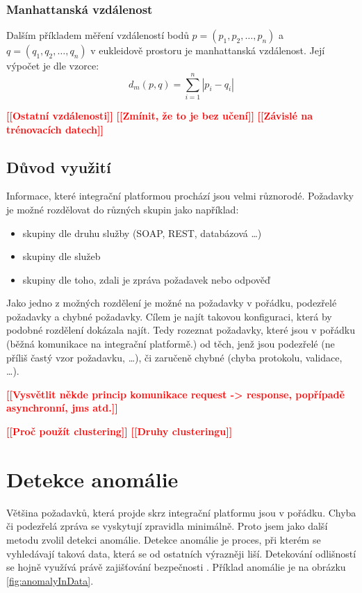 \documentclass[thesis=M,czech]{FITthesis}[2012/10/20]
\newcommand{\todo}[1]{\textcolor{red}{\textbf{[[#1]]}}}
\begin{document}
				\subsubsection{Manhattanská vzdálenost}
				Dalším příkladem měření vzdáleností bodů $p = (p_1, p_2, \ldots, p_n)$ a $q = (q_1, q_2, \ldots, q_n)$ v eukleidově prostoru je manhattanská vzdálenost. Její výpočet je dle vzorce:
				$$d_m(p,q) = \sum_{i = 1}^{n} |p_i - q_i| $$
				
			\todo{Ostatní vzdálenosti}
			\todo{Zmínit, že to je bez učení}
			\todo{Závislé na trénovacích datech}
			
		\subsection{Důvod využití}
			Informace, které integrační platformou prochází jsou velmi různorodé. Požadavky je možné rozdělovat do různých skupin jako například:
			
			\begin{itemize} 
				\item skupiny dle druhu služby (SOAP, REST, databázová \ldots)
				\item skupiny dle služeb 
				\item skupiny dle toho, zdali je zpráva požadavek nebo odpověď		
			\end{itemize}
		
			Jako jedno z možných rozdělení je možné na požadavky v pořádku, podezřelé požadavky a chybné požadavky. Cílem je najít takovou konfiguraci, která by podobné rozdělení dokázala najít. Tedy rozeznat požadavky, které jsou v pořádku (běžná komunikace na integrační platformě.) od těch, jenž jsou podezřelé (ne příliš častý vzor požadavku, \ldots), či zaručeně chybné (chyba protokolu, validace, \ldots). 
		
		\todo{Vysvětlit někde princip komunikace request -> response, popřípadě asynchronní, jms atd.}
			
		
		
		\todo{Proč použít clustering}
		\todo{Druhy clusteringu}
	
	\section{Detekce anomálie}
		Většina požadavků, která projde skrz integrační platformu jsou v pořádku. Chyba či podezřelá zpráva se vyskytují zpravidla minimálně. Proto jsem jako další metodu zvolil detekci anomálie. Detekce anomálie je proces, při kterém se vyhledávají taková data, která se od ostatních výrazněji liší. Detekování odlišností se hojně využívá právě zajišťování bezpečnosti \cite{AnomDetectPCA}. Příklad anomálie je na obrázku \ref{fig:anomalyInData}.
		
\end{document}
